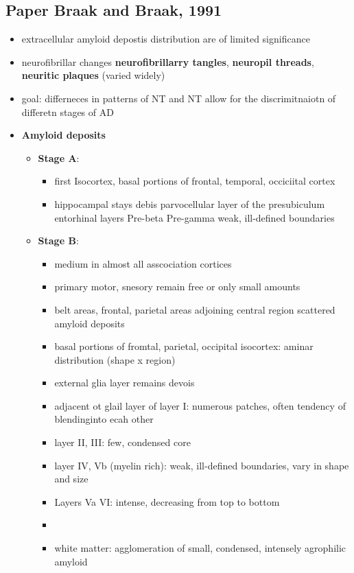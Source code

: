 \documentclass[fleqn]{article}\usepackage{caption}
\begin{document}
\subsection{Paper Braak and Braak, 1991}
\begin{itemize}
\item extracellular amyloid depostis distribution are of limited significance 
\item neurofibrillar changes \textbf{neurofibrillarry tangles}, \textbf{neuropil threads}, \textbf{neuritic plaques} (varied widely)
\item goal: differneces in patterns of NT and NT allow for the discrimitnaiotn of differetn stages of AD
\item \textbf{Amyloid  deposits}
\begin{itemize}
\item \textbf{Stage A}: 
\begin{itemize}
\item first Isocortex, basal portions of frontal, temporal, occiciital cortex
\item hippocampal stays debis
parvocellular layer of the presubiculum entorhinal layers Pre-beta Pre-gamma weak, ill-defined boundaries
\end{itemize}

\item \textbf{Stage B}: 
\begin{itemize}
\item medium in almost all asscociation cortices
\item primary motor, snesory remain free or only small amounts
\item belt areas, frontal, parietal areas adjoining central region scattered amyloid deposits
\item basal portions of fromtal, parietal, occipital isocortex: aminar distribution (shape x region)
\item external glia layer remains devois
\item adjacent ot glail layer of layer I: numerous patches, often tendency of blendinginto ecah other
\item layer II, III: few, condensed core
\item layer IV, Vb (myelin rich): weak, ill-defined boundaries, vary in shape and size
\item Layers Va VI: intense, decreasing from top to bottom
\item 
\item white matter: agglomeration of small, condensed, intensely agrophilic amyloid
\end{itemize}


\end{itemize}
\end{itemize}
\end{document}

